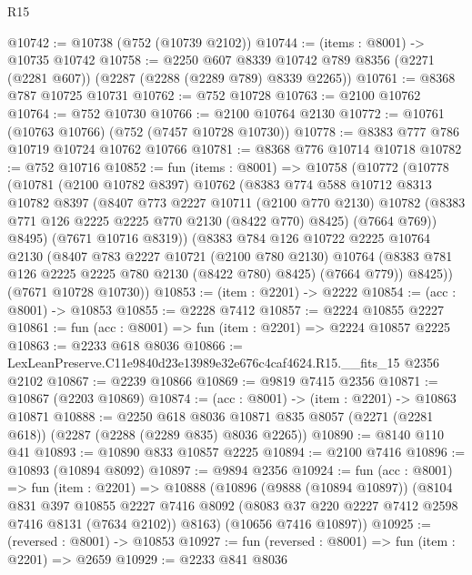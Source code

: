 \begin{lexlean}{R15}
\begin{coremodule}
@10742 := @10738 (@752 (@10739 @2102))
@10744 := (items : @8001) -> @10735 @10742
@10758 := @2250
    @607
    @8339
    @10742
    @789
    @8356
    (@2271 (@2281 @607))
    (@2287 (@2288 (@2289 @789) @8339 @2265))
@10761 := @8368 @787 @10725 @10731
@10762 := @752 @10728
@10763 := @2100 @10762
@10764 := @752 @10730
@10766 := @2100 @10764 @2130
@10772 := @10761 (@10763 @10766) (@752 (@7457 @10728 @10730))
@10778 := @8383 @777 @786 @10719 @10724 @10762 @10766
@10781 := @8368 @776 @10714 @10718
@10782 := @752 @10716
@10852 := fun (items : @8001) =>
  @10758
    (@10772
      (@10778
        (@10781
          (@2100 @10782 @8397)
          @10762
          (@8383
            @774
            @588
            @10712
            @8313
            @10782
            @8397
            (@8407
              @773
              @2227
              @10711
              (@2100 @770 @2130)
              @10782
              (@8383 @771 @126 @2225 @2225 @770 @2130 (@8422 @770) @8425)
              (@7664 @769))
            @8495)
          (@7671 @10716 @8319))
        (@8383
          @784
          @126
          @10722
          @2225
          @10764
          @2130
          (@8407
            @783
            @2227
            @10721
            (@2100 @780 @2130)
            @10764
            (@8383 @781 @126 @2225 @2225 @780 @2130 (@8422 @780) @8425)
            (@7664 @779))
          @8425))
      (@7671 @10728 @10730))
@10853 := (item : @2201) -> @2222
@10854 := (acc : @8001) -> @10853
@10855 := @2228 @7412
@10857 := @2224 @10855 @2227
@10861 := fun (acc : @8001) => fun (item : @2201) => @2224 @10857 @2225
@10863 := @2233 @618 @8036
@10866 := LexLeanPreserve.C11e9840d23e13989e32e676c4caf4624.R15.__fits_15 @2356 @2102
@10867 := @2239 @10866
@10869 := @9819 @7415 @2356
@10871 := @10867 (@2203 @10869)
@10874 := (acc : @8001) -> (item : @2201) -> @10863 @10871
@10888 := @2250
    @618
    @8036
    @10871
    @835
    @8057
    (@2271 (@2281 @618))
    (@2287 (@2288 (@2289 @835) @8036 @2265))
@10890 := @8140 @110 @41
@10893 := @10890 @833 @10857 @2225
@10894 := @2100 @7416
@10896 := @10893 (@10894 @8092)
@10897 := @9894 @2356
@10924 := fun (acc : @8001) =>
  fun (item : @2201) =>
  @10888
    (@10896
      (@9888 (@10894 @10897))
      (@8104
        @831
        @397
        @10855
        @2227
        @7416
        @8092
        (@8083 @37 @220 @2227 @7412 @2598 @7416 @8131 (@7634 @2102))
        @8163)
      (@10656 @7416 @10897))
@10925 := (reversed : @8001) -> @10853
@10927 := fun (reversed : @8001) => fun (item : @2201) => @2659
@10929 := @2233 @841 @8036

\end{coremodule}
\end{lexlean}
